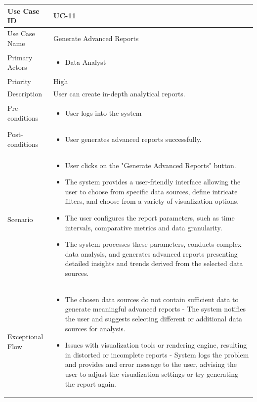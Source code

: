 \vspace{12pt}

\begin{tabularx}{\textwidth}{|l|X|}
\hline
Use Case ID & UC-11 \\
\hline
Use Case Name & Generate Advanced Reports\\
\hline
Primary Actors & 
\begin{itemize}
    \item Data Analyst
\end{itemize} \\
\hline
Priority & High \\
\hline
Description & User can create in-depth analytical reports. \\
\hline
Pre-conditions & 
\begin{itemize}
    \item User logs into the system
\end{itemize} \\
\hline
Post-conditions & 
\begin{itemize}
    \item User generates advanced reports successfully.
\end{itemize} \\
\hline
Scenario & 
\begin{itemize}
    \item User clicks on the "Generate Advanced Reports" button. 
    \item The system provides a user-friendly interface allowing the user to choose from specific data sources, define intricate filters, and choose from a variety of visualization options.
    \item The user configures the report parameters, such as time intervals, comparative metrics and data granularity.
    \item The system processes these parameters, conducts complex data analysis, and generates advanced reports presenting detailed insights and trends derived from the selected data sources.
\end{itemize}\\
\hline
Exceptional Flow & 
\begin{itemize}
    \item The chosen data sources do not contain sufficient data to generate meaningful advanced reports - The system notifies the user and suggests selecting different or additional data sources for analysis.
    \item Issues with visualization tools or rendering engine, resulting in distorted or incomplete reports - System logs the problem and provides and error message to the user, advising the user to adjust the visualization settings or try generating the report again.
\end{itemize}\\
\hline
\end{tabularx}

